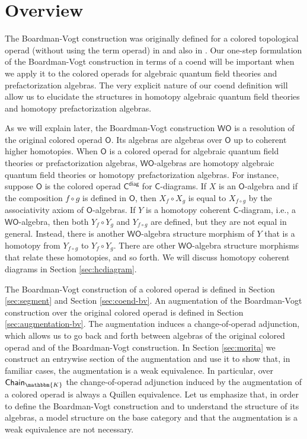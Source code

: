 \documentclass[11pt]{amsbook}
\numberwithin{section}{chapter}
\numberwithin{subsection}{section}
\numberwithin{equation}{section}
\theoremstyle{plain}
\theoremstyle{definition}
\newcommand{\fieldk}{\mathbbm{K}}
\newcommand{\C}{\mathsf{C}}
\renewcommand{\O}{\mathsf{O}}
\newcommand{\W}{\mathsf{W}}
\newcommand{\Cdiag}{\C^{\mathsf{diag}}}
\newcommand{\Chaink}{\mathsf{Chain}_{\fieldk}}
\newcommand{\wo}{\W\O}
\begin{document}
\section{Overview}
The Boardman-Vogt construction was originally defined for a colored topological operad (without using the term operad) in \cite{boardman-vogt} and also in \cite{vogt}.  Our one-step formulation of the Boardman-Vogt construction in terms of a coend will be important when we apply it to the colored operads for algebraic quantum field theories and prefactorization algebras.  The very explicit nature of our coend definition will allow us to elucidate the structures in homotopy algebraic quantum field theories and homotopy prefactorization algebras.

As we will explain later, the Boardman-Vogt construction $\wo$ is a resolution of the original colored operad $\O$.  Its algebras are algebras over $\O$ up to coherent higher homotopies.  When $\O$ is a colored operad for algebraic quantum field theories or prefactorization algebras, $\wo$-algebras are homotopy algebraic quantum field theories or homotopy prefactorization algebras.  For instance, suppose $\O$ is the colored operad $\Cdiag$ for $\C$-diagrams.  If $X$ is an $\O$-algebra and if the composition $f\circ g$ is defined in $\O$, then $X_f \circ X_g$ is equal to $X_{f\circ g}$ by the associativity axiom of $\O$-algebras.  If $Y$ is a homotopy coherent $\C$-diagram, i.e., a $\wo$-algebra, then both $Y_f \circ Y_g$ and $Y_{f\circ g}$ are defined, but they are not equal in general.  Instead, there is another $\wo$-algebra structure morphism of $Y$ that is a homotopy from $Y_{f\circ g}$ to $Y_f \circ Y_g$.  There are other $\wo$-algebra structure morphisms that relate these homotopies, and so forth.  We will discuss homotopy coherent diagrams in Section \ref{sec:hcdiagram}.

The Boardman-Vogt construction of a colored operad is defined in Section \ref{sec:segment} and Section \ref{sec:coend-bv}.  An augmentation of the Boardman-Vogt construction over the original colored operad is defined in Section \ref{sec:augmentation-bv}.  The augmentation induces a change-of-operad adjunction, which allows us to go back and forth between algebras of the original colored operad and of the Boardman-Vogt construction.  In Section \ref{sec:morita} we construct an entrywise section of the augmentation and use it to show that, in familiar cases, the augmentation is a weak equivalence.  In particular, over $\Chaink$ the change-of-operad adjunction induced by the augmentation of a colored operad is always a Quillen equivalence.  Let us emphasize that, in order to define the Boardman-Vogt construction and to understand the structure of its algebras, a model structure on the base category and that the augmentation is a weak equivalence are not necessary.
\end{document}
